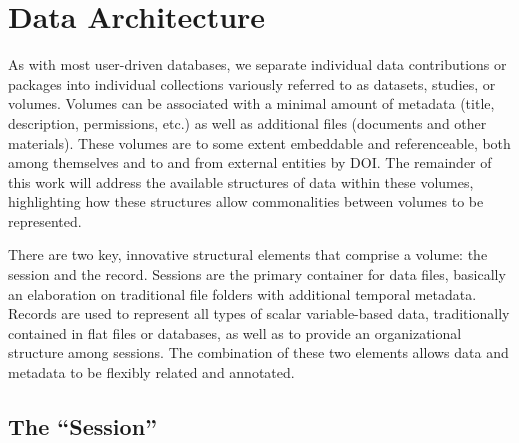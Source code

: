 \documentclass{sig-alternate}
\begin{document}
\section{Data Architecture}


As with most user-driven databases, we separate individual data contributions or packages into individual collections variously referred to as datasets, studies, or volumes.
Volumes can be associated with a minimal amount of metadata (title, description, permissions, etc.) as well as additional files (documents and other materials).
These volumes are to some extent embeddable and referenceable, both among themselves and to and from external entities by DOI.
The remainder of this work will address the available structures of data within these volumes, highlighting how these structures allow commonalities between volumes to be represented.


There are two key, innovative structural elements that comprise a volume: the session and the record.
Sessions are the primary container for data files, basically an elaboration on traditional file folders with additional temporal metadata.
Records are used to represent all types of scalar variable-based data, traditionally contained in flat files or databases, as well as to provide an organizational structure among sessions.
The combination of these two elements allows data and metadata to be flexibly related and annotated.

\subsection{The ``Session''}
\end{document}

